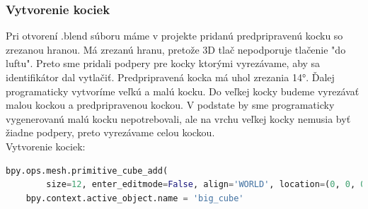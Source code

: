 \subsubsection{Vytvorenie kociek}
Pri otvorení .blend súboru máme v projekte pridanú predpripravenú kocku so zrezanou hranou. Má zrezanú hranu, pretože 3D tlač nepodporuje tlačenie "do luftu". Preto sme pridali podpery pre kocky ktorými vyrezávame, aby sa identifikátor dal vytlačiť. Predpripravená kocka má uhol zrezania 14°. Ďalej programaticky vytvoríme veľkú a malú kocku. Do veľkej kocky budeme vyrezávať malou kockou a predpripravenou kockou. V podstate by sme programaticky vygenerovanú malú kocku nepotrebovali, ale na vrchu veľkej kocky nemusia byť žiadne podpery, preto vyrezávame celou kockou. \\Vytvorenie kociek: 
\begin{lstlisting}[language=Python]
    bpy.ops.mesh.primitive_cube_add(
        size=12, enter_editmode=False, align='WORLD', location=(0, 0, 0))
    bpy.context.active_object.name = 'big_cube'
\end{lstlisting}

